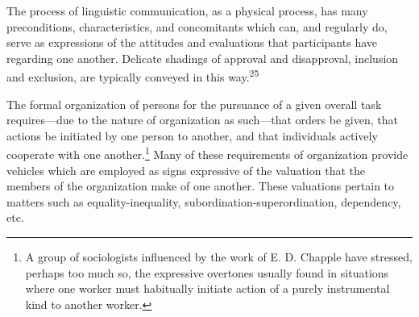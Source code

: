 \documentclass[openany,nobib]{tufte-book}
\begin{document}
The process of linguistic communication, as a physical process, has many
preconditions, characteristics, and concomitants which can, and
regularly do, serve as expressions of the attitudes and evaluations that
participants have regarding one another. Delicate shadings of approval
and disapproval, inclusion and exclusion, are typically conveyed in this
way.\textsuperscript{25}

The formal organization of persons for the pursuance of a given overall
task requires---due to the nature of organization as such---that orders
be given, that actions be initiated by one person to another, and that
individuals actively cooperate with one another.\footnote{A group of
  sociologists influenced by the work of E. D. Chapple have stressed,
  perhaps too much so, the expressive overtones usually found in
  situations where one worker must habitually initiate action of a
  purely instrumental kind to another worker.} Many of these
requirements of organization provide vehicles which are employed as
signs expressive of the valuation that the members of the organization
make of one another. These valuations pertain to matters such as
equality-inequality, subordination-superordination, dependency, etc.
\end{document}
